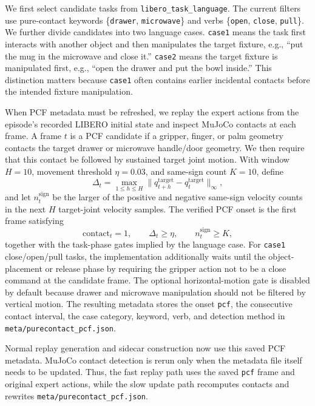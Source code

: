 \documentclass[10pt,twocolumn,letterpaper]{article}
\begin{document}
We first select candidate tasks from \texttt{libero\_task\_language}. The current filters use pure-contact keywords \{\texttt{drawer}, \texttt{microwave}\} and verbs \{\texttt{open}, \texttt{close}, \texttt{pull}\}. We further divide candidates into two language cases. \texttt{case1} means the task first interacts with another object and then manipulates the target fixture, e.g., ``put the mug in the microwave and close it.'' \texttt{case2} means the target fixture is manipulated first, e.g., ``open the drawer and put the bowl inside.'' This distinction matters because \texttt{case1} often contains earlier incidental contacts before the intended fixture manipulation.

When PCF metadata must be refreshed, we replay the expert actions from the episode's recorded LIBERO initial state and inspect MuJoCo contacts at each frame. A frame $t$ is a PCF candidate if a gripper, finger, or palm geometry contacts the target drawer or microwave handle/door geometry. We then require that this contact be followed by sustained target joint motion. With window $H=10$, movement threshold $\eta=0.03$, and same-sign count $K=10$, define
\begin{equation}
\Delta_t=\max_{1\le h\le H}\lVert q_{t+h}^{\mathrm{target}}-q_t^{\mathrm{target}}\rVert_\infty,
\end{equation}
and let $n_t^{\mathrm{sign}}$ be the larger of the positive and negative same-sign velocity counts in the next $H$ target-joint velocity samples. The verified PCF onset is the first frame satisfying
\begin{equation}
\mathrm{contact}_t=1,\qquad
\Delta_t\ge \eta,\qquad
n_t^{\mathrm{sign}}\ge K,
\end{equation}
together with the task-phase gates implied by the language case. For \texttt{case1} close/open/pull tasks, the implementation additionally waits until the object-placement or release phase by requiring the gripper action not to be a close command at the candidate frame. The optional horizontal-motion gate is disabled by default because drawer and microwave manipulation should not be filtered by vertical motion. The resulting metadata stores the onset \texttt{pcf}, the consecutive contact interval, the case category, keyword, verb, and detection method in \texttt{meta/purecontact\_pcf.json}.

Normal replay generation and sidecar construction now use this saved PCF metadata. MuJoCo contact detection is rerun only when the metadata file itself needs to be updated. Thus, the fast replay path uses the saved \texttt{pcf} frame and original expert actions, while the slow update path recomputes contacts and rewrites \texttt{meta/purecontact\_pcf.json}.
\end{document}
